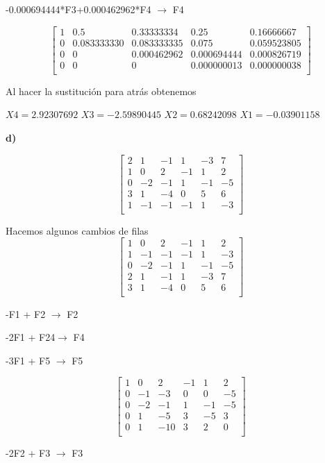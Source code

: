 \documentclass[12pt]{article}
\begin{document}
-0.000694444*F3+0.000462962*F4 $\longrightarrow $ F4

\[
\begin{bmatrix}
1 & 0.5 & 0.33333334 & 0.25 & 0.16666667 \\
0 & 0.083333330 & 0.083333335 & 0.075 & 0.059523805\\
0 & 0 & 0.000462962 & 0.000694444 & 0.000826719\\
0 & 0 & 0 & 0.000000013 & 0.000000038\\
\end{bmatrix}
\]

Al hacer la sustitución para atrás obtenemos

$X4 = 2.92307692$ $X3 = -2.59890445$   $X2 =0.68242098$  $X1 =-0.03901158$ 


\textbf{d)}

\[
\begin{bmatrix}
2 & 1 & -1 & 1 & -3 & 7\\
1 & 0 & 2 & -1 & 1 & 2\\
0 & -2 & -1 & 1 & -1 & -5\\
3 & 1 & -4 & 0 & 5 & 6\\
1 & -1 & -1 & -1 & 1 & -3\\
\end{bmatrix}
\]

Hacemos algunos cambios de filas
\[
\begin{bmatrix}
1 & 0 & 2 & -1 & 1 & 2\\ 
1 & -1 & -1 & -1 & 1 & -3\\
0 & -2 & -1 & 1 & -1 & -5\\   
2 & 1 & -1 & 1 & -3 & 7\\
3 & 1 & -4 & 0 & 5 & 6\\
\end{bmatrix}
\]

-F1 + F2 $\longrightarrow $ F2

-2F1 + F24$\longrightarrow $ F4

-3F1 + F5 $\longrightarrow $ F5

\[
\begin{bmatrix}
1 & 0 & 2 & -1 & 1 & 2\\ 
0 & -1 & -3 & 0 & 0 & -5\\
0 & -2 & -1 & 1 & -1 & -5\\   
0 & 1 & -5 & 3 & -5 & 3\\
0 & 1 & -10 & 3 & 2 & 0\\
\end{bmatrix}
\]

-2F2 + F3 $\longrightarrow $ F3
\end{document}
